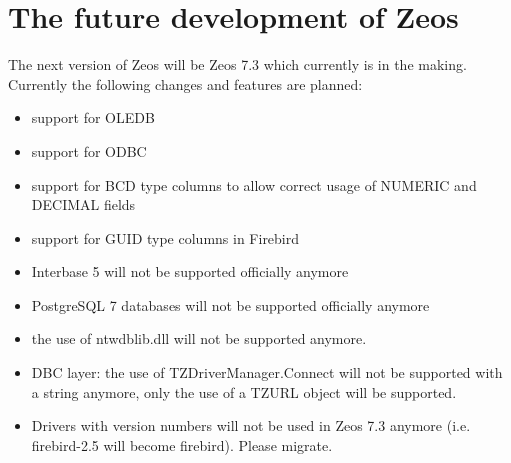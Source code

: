 \documentclass[a4paper,12pt,oneside]{article}
\begin{document}
\section{The future development of Zeos}
\label{sec:FutureDevelopmentOfZeos}
The next version of Zeos will be Zeos 7.3 which currently is in the making.
Currently the following changes and features are planned:
\begin{itemize}
\item support for OLEDB
\item support for ODBC
\item support for BCD type columns to allow correct usage of NUMERIC and DECIMAL fields
\item support for GUID type columns in Firebird
\item Interbase 5 will not be supported officially anymore
\item PostgreSQL 7 databases will not be supported officially anymore
\item the use of ntwdblib.dll will not be supported anymore.
\item DBC layer: the use of TZDriverManager.Connect will not be supported with a string anymore, only the use of a TZURL object will be supported.
\item
  Drivers with version numbers will not be used in Zeos 7.3 anymore (i.e. firebird-2.5 will become firebird).
  Please migrate.
\end{itemize}
\end{document}
